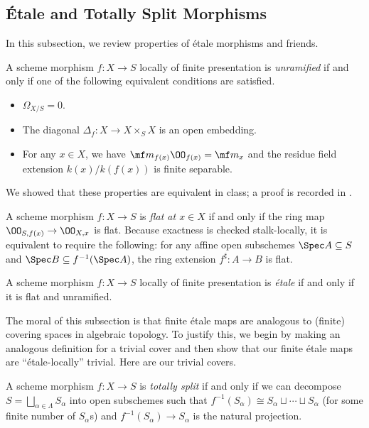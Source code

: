 \documentclass{amsart}
\begin{document}
\subsection{\'Etale and Totally Split Morphisms}
In this subsection, we review properties of \'etale morphisms and friends.
\begin{definition}[unramified]
    A scheme morphism $f\colon X\to S$ locally of finite presentation is \textit{unramified} if and only if one of the following equivalent conditions are satisfied.
    \begin{itemize}
        \item $\Omega_{X/S}=0$.
        \item The diagonal $\Delta_f\colon X\to X\times_SX$ is an open embedding.
        \item For any $x\in X$, we have $\mf m_{f(x)}\OO_{f(x)}=\mf m_x$ and the residue field extension $k(x)/k(f(x))$ is finite separable.
    \end{itemize}
    We showed that these properties are equivalent in class; a proof is recorded in \cite[\href{https://stacks.math.columbia.edu/tag/02GF}{Lemma 02GF}]{stacks}.
\end{definition}
\begin{definition}[flat]
    A scheme morphism $f\colon X\to S$ is \textit{flat at $x\in X$} if and only if the ring map $\OO_{S,f(x)}\to\OO_{X,x}$ is flat. Because exactness is checked stalk-locally, it is equivalent to require the following: for any affine open subschemes $\Spec A\subseteq S$ and $\Spec B\subseteq f^{-1}(\Spec A)$, the ring extension $f^\sharp\colon A\to B$ is flat.
\end{definition}
\begin{definition}[\'etale]
    A scheme morphism $f\colon X\to S$ locally of finite presentation is \textit{\'etale} if and only if it is flat and unramified.
\end{definition}
The moral of this subsection is that finite \'etale maps are analogous to (finite) covering spaces in algebraic topology. To justify this, we begin by making an analogous definition for a trivial cover and then show that our finite \'etale maps are ``\'etale-locally'' trivial. Here are our trivial covers.
\begin{definition}
    A scheme morphism $f\colon X\to S$ is \textit{totally split} if and only if we can decompose $S=\bigsqcup_{\alpha\in\Lambda} S_\alpha$ into open subschemes such that $f^{-1}(S_\alpha)\cong S_\alpha\sqcup\cdots\sqcup S_\alpha$ (for some finite number of $S_\alpha$s) and $f^{-1}(S_\alpha)\to S_\alpha$ is the natural projection.
\end{definition}
\end{document}
